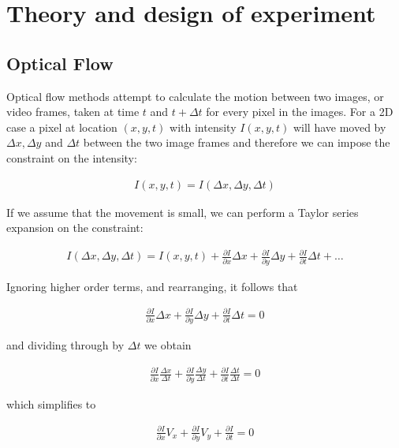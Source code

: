 \chapter{Theory and design of experiment}
\label{sec:theory}

\ifpdf
    \graphicspath{{Section2/Figs/Raster/}{Section2/Figs/PDF/}{Section2/Figs/}}
\else
    \graphicspath{{Section2/Figs/Vector/}{Section2/Figs/}}
\fi

\section{Optical Flow}

Optical flow methods attempt to calculate the motion between two images, or video frames, taken at time $t$ and $t + \Delta t$ for every pixel in the images. For a 2D case a pixel at location $(x, y, t)$ with intensity $I(x, y, t)$ will have moved by $\Delta x, \Delta y$ and $\Delta t$ between the two image frames and therefore we can impose the constraint on the intensity:

\begin{align*}
  I(x, y, t) = I(\Delta x, \Delta y, \Delta t)
\end{align*}

If we assume that the movement is small, we can perform a Taylor series expansion on the constraint:

\begin{align*}
  I(\Delta x, \Delta y, \Delta t) = I(x, y, t) + \frac{\partial I}{\partial x}\Delta x+\frac{\partial I}{\partial y}\Delta y+\frac{\partial I}{\partial t}\Delta t + \dots
\end{align*}

Ignoring higher order terms, and rearranging, it follows that

\begin{align*}
  \frac{\partial I}{\partial x}\Delta x+\frac{\partial I}{\partial y}\Delta y+\frac{\partial I}{\partial t}\Delta t = 0
\end{align*}

and dividing through by $\Delta t$ we obtain

\begin{align*}
  \frac{\partial I}{\partial x}\frac{\Delta x}{\Delta t}+\frac{\partial I}{\partial y}\frac{\Delta y}{\Delta t}+\frac{\partial I}{\partial t}\frac{\Delta t}{\Delta t} = 0
\end{align*}

which simplifies to

\begin{align*}
  \frac{\partial I}{\partial x}V_x+\frac{\partial I}{\partial y}V_y+\frac{\partial I}{\partial t} = 0
\end{align*}

